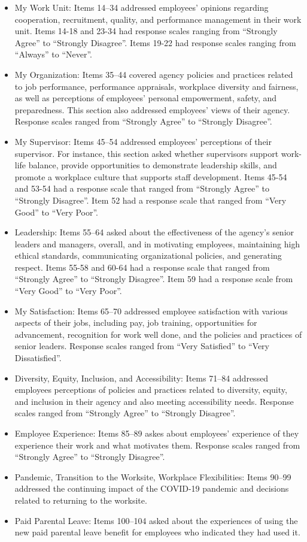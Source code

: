 \documentclass[
  man]{apa7}
\begin{document}
\begin{itemize}
\item
  My Work Unit: Items 14--34 addressed employees' opinions regarding cooperation, recruitment, quality, and performance management in their work unit. Items 14-18 and 23-34 had response scales ranging from ``Strongly Agree'' to ``Strongly Disagree''. Items 19-22 had response scales ranging from ``Always'' to ``Never''.
\item
  My Organization: Items 35--44 covered agency policies and practices related to job performance, performance appraisals, workplace diversity and fairness, as well as perceptions of employees' personal empowerment, safety, and preparedness. This section also addressed employees' views of their agency. Response scales ranged from ``Strongly Agree'' to ``Strongly Disagree''.
\item
  My Supervisor: Items 45--54 addressed employees' perceptions of their supervisor. For instance, this section asked whether supervisors support work-life balance, provide opportunities to demonstrate leadership skills, and promote a workplace culture that supports staff development. Items 45-54 and 53-54 had a response scale that ranged from ``Strongly Agree'' to ``Strongly Disagree''. Item 52 had a response scale that ranged from ``Very Good'' to ``Very Poor''.
\item
  Leadership: Items 55--64 asked about the effectiveness of the agency's senior leaders and managers, overall, and in motivating employees, maintaining high ethical standards, communicating organizational policies, and generating respect. Items 55-58 and 60-64 had a response scale that ranged from ``Strongly Agree'' to ``Strongly Disagree''. Item 59 had a response scale from ``Very Good'' to ``Very Poor''.
\item
  My Satisfaction: Items 65--70 addressed employee satisfaction with various aspects of their jobs, including pay, job training, opportunities for advancement, recognition for work well done, and the policies and practices of senior leaders. Response scales ranged from ``Very Satisfied'' to ``Very Dissatisfied''.
\item
  Diversity, Equity, Inclusion, and Accessibility: Items 71--84 addressed employees perceptions of policies and practices related to diversity, equity, and inclusion in their agency and also meeting accessibility needs. Response scales ranged from ``Strongly Agree'' to ``Strongly Disagree''.
\item
  Employee Experience: Items 85--89 askes about employees' experience of they experience their work and what motivates them. Response scales ranged from ``Strongly Agree'' to ``Strongly Disagree''.
\item
  Pandemic, Transition to the Worksite, Workplace Flexibilities: Items 90--99 addressed the continuing impact of the COVID-19 pandemic and decisions related to returning to the worksite.
\item
  Paid Parental Leave: Items 100--104 asked about the experiences of using the new paid parental leave benefit for employees who indicated they had used it.
\end{itemize}
\end{document}
